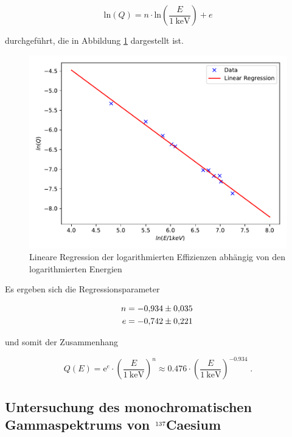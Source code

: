\begin{equation}
  \text{ln}(Q) = n \cdot \text{ln}(\frac{E}{\SI{1}{\kilo\eV}}) + e
\end{equation}

durchgeführt, die in Abbildung \ref{fig:plot6} dargestellt ist.

\begin{figure}
  \centering
  \includegraphics[scale=0.7]{content/plot6.pdf}
  \caption{Lineare Regression der logarithmierten Effizienzen abhängig von den logarithmierten Energien}
  \label{fig:plot6}
\end{figure}

Es ergeben sich die Regressionsparameter

\begin{align*}
  n &= \num{-0.934 +- 0.035} \\
  e &= \num{-0.742 +- 0.221} \; 
\end{align*}

und somit der Zusammenhang

\begin{equation}
  \label{eqn:eff}
  Q(E) = \text{e}^e \cdot \left(\frac{E}{\SI{1}{\kilo\eV}}\right)^n 
  \approx \num{0.476} \cdot \left(\frac{E}{\SI{1}{\kilo\eV}}\right)^{\num{-0.934}} \; .
\end{equation}


\subsection{Untersuchung des monochromatischen Gammaspektrums von $\ce{^{137}}$Caesium}


